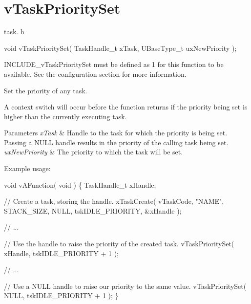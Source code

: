 \hypertarget{group__v_task_priority_set}{}\section{v\+Task\+Priority\+Set}
\label{group__v_task_priority_set}
task. h 
\begin{DoxyPre}void vTaskPrioritySet( TaskHandle\_t xTask, UBaseType\_t uxNewPriority );\end{DoxyPre}


I\+N\+C\+L\+U\+D\+E\+\_\+v\+Task\+Priority\+Set must be defined as 1 for this function to be available. See the configuration section for more information.

Set the priority of any task.

A context switch will occur before the function returns if the priority being set is higher than the currently executing task.


\begin{DoxyParams}{Parameters}
{\em x\+Task} & Handle to the task for which the priority is being set. Passing a N\+U\+LL handle results in the priority of the calling task being set.\\
\hline
{\em ux\+New\+Priority} & The priority to which the task will be set.\\
\hline
\end{DoxyParams}
Example usage\+: 
\begin{DoxyPre}
void vAFunction( void )
\{
TaskHandle\_t xHandle;\end{DoxyPre}



\begin{DoxyPre}    // Create a task, storing the handle.
    xTaskCreate( vTaskCode, "NAME", STACK\_SIZE, NULL, tskIDLE\_PRIORITY, \&xHandle );\end{DoxyPre}



\begin{DoxyPre}    // ...\end{DoxyPre}



\begin{DoxyPre}    // Use the handle to raise the priority of the created task.
    vTaskPrioritySet( xHandle, tskIDLE\_PRIORITY + 1 );\end{DoxyPre}



\begin{DoxyPre}    // ...\end{DoxyPre}



\begin{DoxyPre}    // Use a NULL handle to raise our priority to the same value.
    vTaskPrioritySet( NULL, tskIDLE\_PRIORITY + 1 );
\}
  \end{DoxyPre}
 